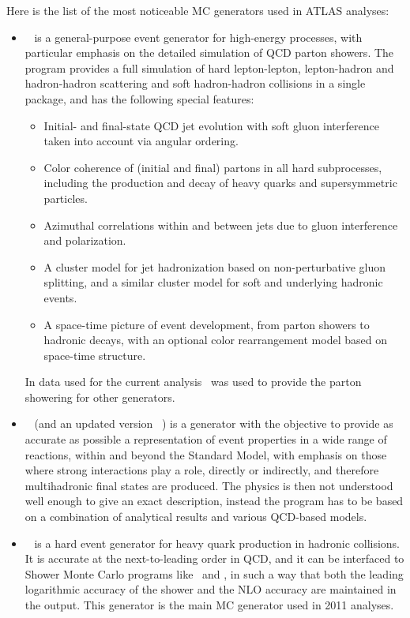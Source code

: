 Here is the list of the most noticeable MC generators used in ATLAS analyses:
\begin{itemize}
\item \Herwig~\cite{lib:MC_herwig} is a general-purpose event generator for high-energy processes, with particular emphasis on the detailed simulation of QCD parton showers. The program provides a full simulation of hard lepton-lepton, lepton-hadron and hadron-hadron scattering and soft hadron-hadron collisions in a single package, and has the following special features:
\begin{itemize}
\item Initial- and final-state QCD jet evolution with soft gluon interference taken into account via angular ordering.
\item Color coherence of (initial and final) partons in all hard subprocesses, including the production and decay of heavy quarks and supersymmetric particles.
\item Azimuthal correlations within and between jets due to gluon interference and polarization.
\item A cluster model for jet hadronization based on non-perturbative gluon splitting, and a similar cluster model for soft and underlying hadronic events.
\item A space-time picture of event development, from parton showers to hadronic decays, with an optional color rearrangement model based on space-time structure.
\end{itemize}
In data used for the current analysis \Herwig\ was used to provide the parton showering for other generators.

\item \Pythia~\cite{lib:MC_pythia6} (and an updated version \Pythiaeight~\cite{lib:MC_pythia8}) is a generator with the objective to provide as accurate as possible a representation of event properties in a wide range of reactions, within and beyond the Standard Model, with emphasis on those where strong interactions play a role, directly or indirectly, and therefore multihadronic final states are produced. The physics is then not understood well enough to give an exact description, instead the program has to be based on a combination of analytical results and various QCD-based models.

\item \Powheg~\cite{lib:MC_powheg} is a hard event generator for heavy quark production in hadronic collisions. It is accurate at the next-to-leading order in QCD, and it can be interfaced to Shower Monte Carlo programs like \Herwig\ and \Pythia, in such a way that both the leading logarithmic accuracy of the shower and the NLO accuracy are maintained in the output. This generator is the main MC generator used in 2011 analyses.


\end{itemize}

